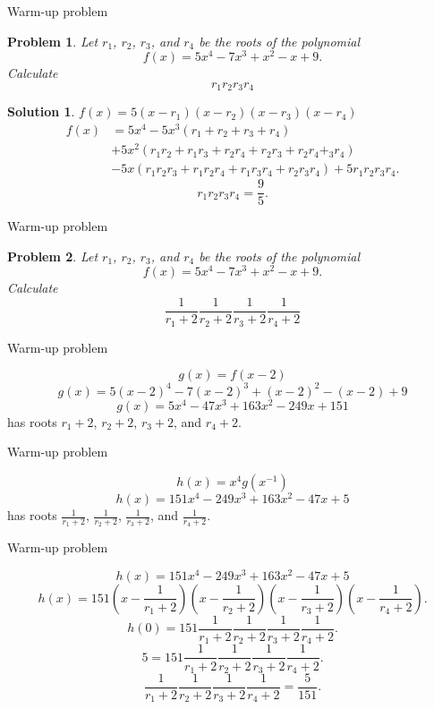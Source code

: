 \documentclass{beamer}
\newtheorem{prob}{Problem}
\newtheorem{soln}{Solution}
\begin{document}
\begin{frame}{Warm-up problem}
\begin{prob}
Let $r_1$, $r_2$, $r_3$, and $r_4$ be the roots of the polynomial
$$f(x) = 5x^4 - 7x^3 + x^2 -x + 9.$$
Calculate
$$r_1r_2r_3r_4$$
\end{prob}
\pause
\begin{soln}
\pause
$f(x) = 5(x-r_1)(x-r_2)(x-r_3)(x-r_4)$
\pause
{\small
\begin{align*}
f(x)
  & = 5x^4 - 5x^3(r_1+r_2+r_3+r_4)\\
  & + 5x^2(r_1r_2+r_1r_3+r_2r_4+r_2r_3+r_2r_4+_3r_4)\\
  & - 5x(r_1r_2r_3+r_1r_2r_4+r_1r_3r_4+r_2r_3r_4) + 5r_1r_2r_3r_4.
\end{align*}
}
\pause
$$r_1r_2r_3r_4 = \frac{9}{5}.$$
\end{soln}
\end{frame}

\begin{frame}{Warm-up problem}
\begin{prob}
Let $r_1$, $r_2$, $r_3$, and $r_4$ be the roots of the polynomial
$$f(x) = 5x^4 - 7x^3 + x^2 -x + 9.$$
Calculate
$$\frac{1}{r_1+2}\frac{1}{r_2+2}\frac{1}{r_3+2}\frac{1}{r_4+2}$$
\end{prob}
\end{frame}

\begin{frame}{Warm-up problem}
\begin{solution}
\pause
$$g(x)  = f(x-2)$$
\pause
$$g(x)  = 5(x-2)^4 - 7(x-2)^3 + (x-2)^2 - (x-2) + 9$$
\pause
$$g(x)  = 5x^4 - 47x^3 + 163x^2 - 249x + 151$$
\pause
has roots $r_1+2$, $r_2+2$, $r_3+2$, and $r_4+2$.
\end{solution}
\end{frame}

\begin{frame}{Warm-up problem}
\begin{solution}
\pause
$$h(x) = x^4g(x^{-1})$$
\pause
$$h(x) = 151x^4 - 249x^3 + 163x^2 - 47x + 5$$
\pause
has roots $\frac{1}{r_1+2}$, $\frac{1}{r_2+2}$, $\frac{1}{r_3+2}$, and $\frac{1}{r_4+2}$.
\end{solution}
\end{frame}

\begin{frame}{Warm-up problem}
\begin{solution}
$$h(x) = 151x^4 - 249x^3 + 163x^2 - 47x + 5$$
\pause
{\small
$$h(x) = 151\left(x-\frac{1}{r_1+2}\right)\left(x-\frac{1}{r_2+2}\right)\left(x-\frac{1}{r_3+2}\right)\left(x-\frac{1}{r_4+2}\right).$$
}
\pause
$$h(0) = 151\frac{1}{r_1+2}\frac{1}{r_2+2}\frac{1}{r_3+2}\frac{1}{r_4+2}.$$
\pause
$$5    = 151\frac{1}{r_1+2}\frac{1}{r_2+2}\frac{1}{r_3+2}\frac{1}{r_4+2}.$$
\pause
$$\frac{1}{r_1+2}\frac{1}{r_2+2}\frac{1}{r_3+2}\frac{1}{r_4+2} = \frac{5}{151}.$$
\end{solution}
\end{frame}
\end{document}
